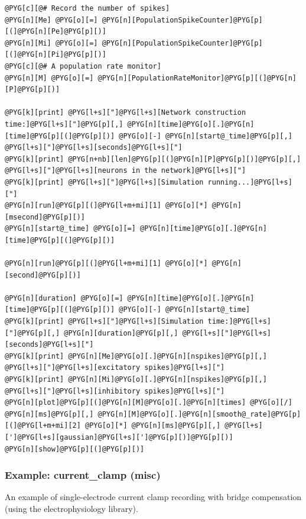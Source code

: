 \documentclass[letterpaper,10pt,english]{manual}
\begin{document}
\begin{Verbatim}[commandchars=@\[\]]
@PYG[c][@# Record the number of spikes]
@PYG[n][Me] @PYG[o][=] @PYG[n][PopulationSpikeCounter]@PYG[p][(]@PYG[n][Pe]@PYG[p][)]
@PYG[n][Mi] @PYG[o][=] @PYG[n][PopulationSpikeCounter]@PYG[p][(]@PYG[n][Pi]@PYG[p][)]
@PYG[c][@# A population rate monitor]
@PYG[n][M] @PYG[o][=] @PYG[n][PopulationRateMonitor]@PYG[p][(]@PYG[n][P]@PYG[p][)]

@PYG[k][print] @PYG[l+s]["]@PYG[l+s][Network construction time:]@PYG[l+s]["]@PYG[p][,] @PYG[n][time]@PYG[o][.]@PYG[n][time]@PYG[p][(]@PYG[p][)] @PYG[o][-] @PYG[n][start@_time]@PYG[p][,] @PYG[l+s]["]@PYG[l+s][seconds]@PYG[l+s]["]
@PYG[k][print] @PYG[n+nb][len]@PYG[p][(]@PYG[n][P]@PYG[p][)]@PYG[p][,] @PYG[l+s]["]@PYG[l+s][neurons in the network]@PYG[l+s]["]
@PYG[k][print] @PYG[l+s]["]@PYG[l+s][Simulation running...]@PYG[l+s]["]
@PYG[n][run]@PYG[p][(]@PYG[l+m+mi][1] @PYG[o][*] @PYG[n][msecond]@PYG[p][)]
@PYG[n][start@_time] @PYG[o][=] @PYG[n][time]@PYG[o][.]@PYG[n][time]@PYG[p][(]@PYG[p][)]

@PYG[n][run]@PYG[p][(]@PYG[l+m+mi][1] @PYG[o][*] @PYG[n][second]@PYG[p][)]

@PYG[n][duration] @PYG[o][=] @PYG[n][time]@PYG[o][.]@PYG[n][time]@PYG[p][(]@PYG[p][)] @PYG[o][-] @PYG[n][start@_time]
@PYG[k][print] @PYG[l+s]["]@PYG[l+s][Simulation time:]@PYG[l+s]["]@PYG[p][,] @PYG[n][duration]@PYG[p][,] @PYG[l+s]["]@PYG[l+s][seconds]@PYG[l+s]["]
@PYG[k][print] @PYG[n][Me]@PYG[o][.]@PYG[n][nspikes]@PYG[p][,] @PYG[l+s]["]@PYG[l+s][excitatory spikes]@PYG[l+s]["]
@PYG[k][print] @PYG[n][Mi]@PYG[o][.]@PYG[n][nspikes]@PYG[p][,] @PYG[l+s]["]@PYG[l+s][inhibitory spikes]@PYG[l+s]["]
@PYG[n][plot]@PYG[p][(]@PYG[n][M]@PYG[o][.]@PYG[n][times] @PYG[o][/] @PYG[n][ms]@PYG[p][,] @PYG[n][M]@PYG[o][.]@PYG[n][smooth@_rate]@PYG[p][(]@PYG[l+m+mi][2] @PYG[o][*] @PYG[n][ms]@PYG[p][,] @PYG[l+s][']@PYG[l+s][gaussian]@PYG[l+s][']@PYG[p][)]@PYG[p][)]
@PYG[n][show]@PYG[p][(]@PYG[p][)]
\end{Verbatim}

\resetcurrentobjects
\hypertarget{--doc-examples-misc_current_clamp}{}

\hypertarget{index-45}{}\subsubsection{Example: current\_clamp (misc)}

An example of single-electrode current clamp recording
with bridge compensation (using the electrophysiology library).
\end{document}
